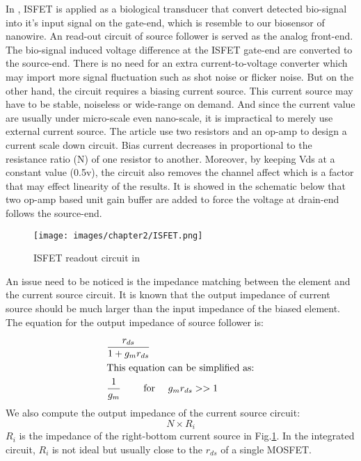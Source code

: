 In \cite{SF1}, ISFET is applied as a biological transducer that convert detected bio-signal into it's input signal on the gate-end, which is resemble to our biosensor of nanowire.
An read-out circuit of source follower is served as the analog front-end.
The bio-signal induced voltage difference at the ISFET gate-end are converted to the source-end.
There is no need for an extra current-to-voltage converter which may import more signal fluctuation such as shot noise or flicker noise.
But on the other hand, the circuit requires a biasing current source.
This current source may have to be stable, noiseless or wide-range on demand.
And since the current value are usually under micro-scale even nano-scale, it is impractical to merely use external current source.
The article use two resistors and an op-amp to design a current scale down circuit.
Bias current decreases in proportional to the resistance ratio (N) of one resistor to another.
Moreover, by keeping Vds at a constant value (0.5v), the circuit also removes {\color{red}the channel affect which is a factor that may effect linearity of the results.}
It is showed in the schematic below that two op-amp based unit gain buffer are added to force the voltage at drain-end follows the source-end.

\begin{figure}[h]
    \centering
    \texttt{[image: images/chapter2/ISFET.png]}
    \fontsize{6}{7}\selectfont
    \caption{ISFET readout circuit in \cite{SF1}}
    \label{fig:ISFET}
\end{figure}

An issue need to be noticed is the impedance matching between the element and the current source circuit.
It is known that the output impedance of current source should be much larger than the input impedance of the biased element.
The equation for the output impedance of source follower is:

\begin{align}
    & \frac{r_{ds}}{1 + g_mr_{ds}}\\
\intertext{This equation can be simplified as:}
    & \frac{1}{g_m} \qquad \text{ for } \quad g_mr_{ds} >> 1 \label{eq:rsf2}
\end{align}
We also compute the output impedance of the current source circuit:
\begin{equation} \label{eq:rcs}
    N\times R_i
\end{equation}
$R_i$ is the impedance of the right-bottom current source in Fig.\ref{fig:ISFET}.
In the integrated circuit, $R_i$ is not ideal but usually close to the $r_{ds}$ of a single MOSFET.

